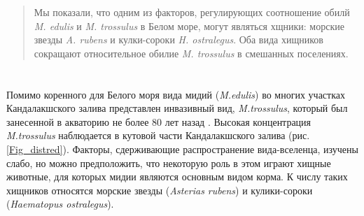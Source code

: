 \documentclass[a0,portrait]{a0poster}
\begin{document}
	\vspace{1 cm} %
	
	
	\begin{multicols}{2} %
		
		
		\color{Navy} %
		
		\begin{abstract}
			
Мы показали, что  одним из факторов, регулирующих соотношение обилй \textit{M. edulis} и \textit{M. trossulus} в Белом море, могут являться хщники: морские звезды \textit{A. rubens} и кулки-сороки \textit{H. ostralegus}. Оба вида хищников сокращают относительное обилие \textit{M. trossulus} в смешанных поселениях.   
			
		\end{abstract}
		
		
		\color{Black} %



\section*{}




		
%
\begin{minipage}[t]{0.4\linewidth}

Помимо коренного для Белого моря вида мидий (\emph{M.edulis}) во многих участках  Кандалакшского залива представлен инвазивный вид, \emph{M.trossulus}, который был занесенной в акваторию не более 80 лет назад \citep{vainola_mytilus_2011}. Высокая концентрация \emph{M.trossulus} наблюдается в кутовой части Кандалакшского залива (рис. \ref{Fig_distred}). Факторы, сдерживающие распространение  вида-вселенца, изучены слабо, но можно предположить, что некоторую роль в этом играют хищные животные, для которых мидии являются основным видом корма. К числу таких хищников относятся морские звезды (\emph{Asterias rubens}) и кулики-сороки (\emph{Haematopus  ostralegus}). 


\end{minipage}
\end{multicols}
\end{document}
